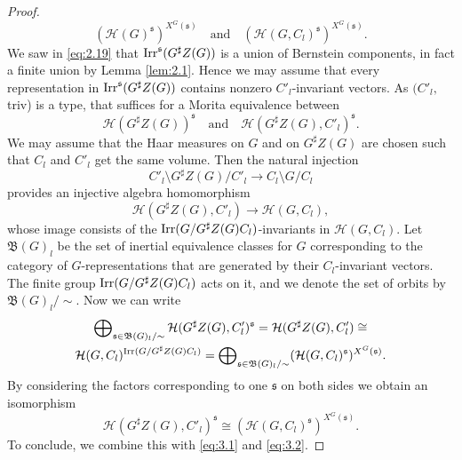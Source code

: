 \documentclass[11pt]{amsart}
\theoremstyle{definition}
\begin{document}
\begin{proof}
\begin{equation}
( {{\mathcal H}} (G)^{{\mathfrak s}} )^{X^G ({{\mathfrak s}})} \quad \text{and} \quad ( {{\mathcal H}} (G,C_l)^{{\mathfrak s}} )^{X^G ({{\mathfrak s}})} .
\end{equation}
We saw in \eqref{eq:2.19} that ${{\rm Irr}}^{{\mathfrak s}} (G^\sharp Z(G))$ is a union of Bernstein 
components, in fact a finite union by Lemma \ref{lem:2.1}. Hence we may assume that every 
representation in ${{\rm Irr}}^{{\mathfrak s}} (G^\sharp Z(G))$ contains nonzero $C'_l$-invariant vectors. 
As $(C'_l,$triv) is a type, that suffices for a Morita equivalence between
\begin{equation}\label{eq:3.2}
{{\mathcal H}} (G^\sharp Z(G))^{{\mathfrak s}} \quad \text{and} \quad {{\mathcal H}} (G^\sharp Z(G),C'_l)^{{\mathfrak s}} . 
\end{equation}
We may assume that the Haar measures on $G$ and on $G^\sharp Z(G)$ are
chosen such that $C_l$ and $C'_l$ get the same volume. Then the natural injection
\[
C'_l \setminus G^\sharp Z(G) / C'_l \to C_l \setminus G / C_l
\]
provides an injective algebra homomorphism
\begin{equation}\label{eq:3.70}
{{\mathcal H}} (G^\sharp Z(G),C'_l) \to {{\mathcal H}} (G,C_l) ,
\end{equation}
whose image consists of the ${{\rm Irr}} (G / G^\sharp Z(G) C_l)$-invariants in ${{\mathcal H}} (G,C_l)$.
Let $\mathfrak B (G)_l$ be the set of inertial equivalence classes 
for $G$ corresponding to the category of $G$-representations that are 
generated by their $C_l$-invariant vectors. The finite group 
${{\rm Irr}} (G / G^\sharp Z(G) C_l)$ acts on it, and we denote the set of orbits by 
$\mathfrak B (G)_l / \sim$. Now we can write
\begin{multline*}
\bigoplus\nolimits_{{{\mathfrak s}} \in \mathfrak B (G)_l / \sim} {{\mathcal H}} (G^\sharp Z(G), C'_l)^{{\mathfrak s}} =
{{\mathcal H}} (G^\sharp Z(G),C'_l) \cong \\
{{\mathcal H}} (G,C_l)^{{{\rm Irr}} (G / G^\sharp Z(G) C_l)} = \bigoplus\nolimits_{{{\mathfrak s}} \in \mathfrak B (G)_l 
/ \sim} ( {{\mathcal H}} (G, C_l)^{{\mathfrak s}} )^{X^G ({{\mathfrak s}})} .
\end{multline*}
By considering the factors corresponding to one ${{\mathfrak s}}$ on both sides we obtain an
isomorphism
\[
{{\mathcal H}} (G^\sharp Z(G), C'_l)^{{\mathfrak s}} \cong ( {{\mathcal H}} (G,C_l)^{{\mathfrak s}} )^{X^G ({{\mathfrak s}})} .
\]
To conclude, we combine this with \eqref{eq:3.1} and \eqref{eq:3.2}.
\end{proof}
\end{document}
